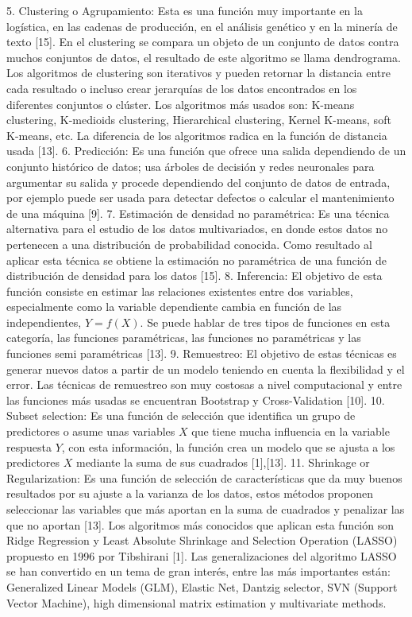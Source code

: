 5.	Clustering o Agrupamiento: Esta es una función muy importante en la logística, en las cadenas de producción, en el análisis genético y en la minería de texto [15]. En el clustering se compara un objeto de un conjunto de datos contra muchos conjuntos de datos, el resultado de este algoritmo se llama dendrograma. Los algoritmos de clustering son iterativos y pueden retornar la distancia entre cada resultado o incluso crear jerarquías de los datos encontrados en los diferentes conjuntos o clúster. Los algoritmos más usados son: K-means clustering, K-medioids clustering, Hierarchical clustering, Kernel K-means, soft K-means, etc. La diferencia de los algoritmos radica en la función de distancia usada [13].
6.	Predicción: Es una función que ofrece una salida dependiendo de un conjunto histórico de datos; usa árboles de decisión y redes neuronales para argumentar su salida y procede dependiendo del conjunto de datos de entrada, por ejemplo puede ser usada para detectar defectos o calcular el mantenimiento de una máquina [9].
7.	Estimación de densidad no paramétrica: Es una técnica alternativa para el estudio de los datos multivariados, en donde estos datos no pertenecen a una distribución de probabilidad conocida. Como resultado al aplicar esta técnica se obtiene la estimación no paramétrica de una función de distribución de densidad para los datos [15].
8.	Inferencia: El objetivo de esta función consiste en estimar las relaciones existentes entre dos variables, especialmente como la variable dependiente cambia en función de las independientes, $Y=f(X)$. Se puede hablar de tres tipos de funciones en esta categoría, las funciones paramétricas, las funciones no paramétricas y las funciones semi paramétricas [13].
9.	Remuestreo: El objetivo de estas técnicas es generar nuevos datos a partir de un modelo teniendo en cuenta la flexibilidad y el error. Las técnicas de remuestreo son muy costosas a nivel computacional y entre las funciones más usadas se encuentran Bootstrap y  Cross-Validation [10].
10.	Subset selection: Es una función de selección que identifica un grupo de predictores o asume unas variables $X$ que tiene mucha influencia en la variable respuesta $Y$, con esta información, la función crea un modelo que se ajusta a los predictores $X$ mediante la suma de sus cuadrados [1],[13].
11.	Shrinkage or Regularization: Es una función de selección de características que da muy buenos resultados por su ajuste a la varianza de los datos, estos métodos proponen seleccionar las variables que más aportan en la suma de cuadrados y penalizar las que no aportan [13]. Los algoritmos más conocidos que aplican esta función son Ridge Regression y Least Absolute Shrinkage and Selection Operation (LASSO) propuesto en 1996 por Tibshirani [1]. Las generalizaciones del algoritmo LASSO se han convertido en un tema de gran interés, entre las más importantes están: Generalized Linear Models (GLM), Elastic Net, Dantzig selector, SVN (Support Vector Machine), high dimensional matrix estimation y multivariate methods.

